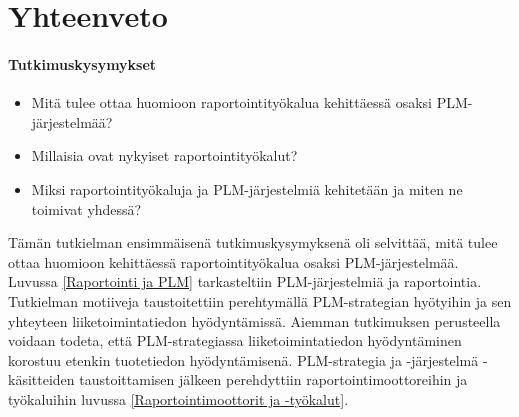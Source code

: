 \chapter{Yhteenveto} \label{Yhteenveto}

\subsubsection{Tutkimuskysymykset}
\begin{itemize}
\item Mitä tulee ottaa huomioon raportointityökalua kehittäessä osaksi PLM-järjestelmää?
\item Millaisia ovat nykyiset raportointityökalut?
\item Miksi raportointityökaluja ja PLM-järjestelmiä kehitetään ja miten ne toimivat yhdessä?
\end{itemize}


Tämän tutkielman ensimmäisenä tutkimuskysymyksenä oli selvittää, mitä tulee ottaa huomioon kehittäessä raportointityökalua osaksi PLM-järjestelmää. Luvussa \ref{Raportointi ja PLM} tarkasteltiin PLM-järjestelmiä ja raportointia. Tutkielman motiiveja taustoitettiin perehtymällä PLM-strategian hyötyihin ja sen yhteyteen liiketoimintatiedon hyödyntämissä. Aiemman tutkimuksen perusteella voidaan todeta, että PLM-strategiassa liiketoimintatiedon hyödyntäminen korostuu etenkin tuotetiedon hyödyntämisenä. \cite{bayro-corrochano_preliminary_2014} PLM-strategia ja -järjestelmä -käsitteiden taustoittamisen jälkeen perehdyttiin raportointimoottoreihin ja työkaluihin luvussa \ref{Raportointimoottorit ja -työkalut}. 

